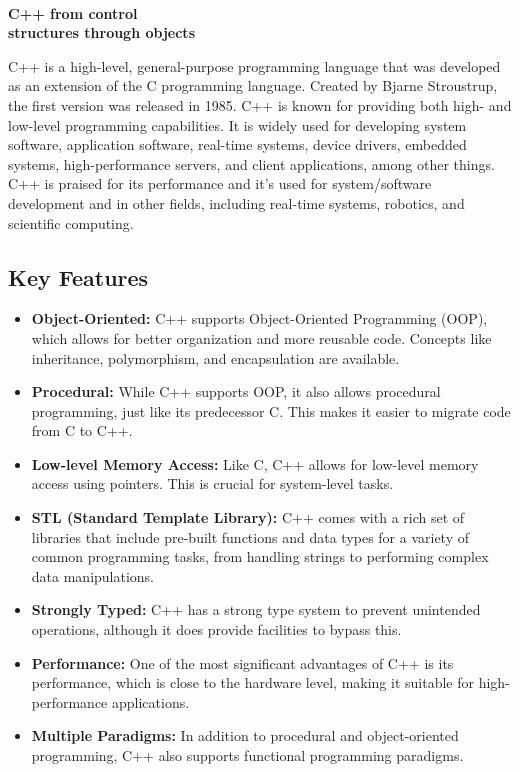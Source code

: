 \documentclass{report}
\begin{document}
    \pagebreak \bigbreak \noindent 
    \vspace{2.2in} \\
    \begin{Huge}
        \textbf{C++ from control \\ structures through objects}
    \end{Huge}
    \bigbreak \noindent 
    
    \bigbreak \noindent 
    \bigbreak \noindent 
    C++ is a high-level, general-purpose programming language that was developed as an extension of the C programming language. Created by Bjarne Stroustrup, the first version was released in 1985. C++ is known for providing both high- and low-level programming capabilities. It is widely used for developing system software, application software, real-time systems, device drivers, embedded systems, high-performance servers, and client applications, among other things. C++ is praised for its performance and it's used for system/software development and in other fields, including real-time systems, robotics, and scientific computing.
    \bigbreak \noindent 
    \subsection{Key Features}
    \bigbreak \noindent 
    \begin{itemize}
        \item \textbf{Object-Oriented:} C++ supports Object-Oriented Programming (OOP), which allows for better organization and more reusable code. Concepts like inheritance, polymorphism, and encapsulation are available.
        \item \textbf{Procedural:} While C++ supports OOP, it also allows procedural programming, just like its predecessor C. This makes it easier to migrate code from C to C++.
        \item \textbf{Low-level Memory Access:} Like C, C++ allows for low-level memory access using pointers. This is crucial for system-level tasks.
        \item \textbf{STL (Standard Template Library):} C++ comes with a rich set of libraries that include pre-built functions and data types for a variety of common programming tasks, from handling strings to performing complex data manipulations.
        \item \textbf{Strongly Typed:} C++ has a strong type system to prevent unintended operations, although it does provide facilities to bypass this.
        \item \textbf{Performance:} One of the most significant advantages of C++ is its performance, which is close to the hardware level, making it suitable for high-performance applications.
        \item \textbf{Multiple Paradigms:} In addition to procedural and object-oriented programming, C++ also supports functional programming paradigms.
    \end{itemize}
\end{document}
